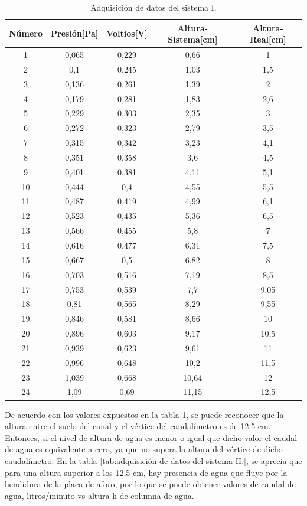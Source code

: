 \begin{table}[htpb]
	\centering
	\caption[Adquisición de datos del sistema I]{Adquisición de datos del sistema I.}
	\begin{tabular}{c c c c c}    
		\toprule
		\textbf{Número}   & \textbf{Presión[Pa]}  & \textbf{Voltios[V]} & \textbf{Altura-Sistema[cm]} & \textbf{Altura-Real[cm]} \\
		\midrule
		1  & 0,065 & 0,229  & 0,66  & 1 \\
		2  & 0,1   & 0,245  & 1,03  & 1,5 \\
		3  & 0,136 & 0,261  & 1,39  & 2 \\
		4  & 0,179 & 0,281  & 1,83  & 2,6 \\
		5  & 0,229 & 0,303	& 2,35  & 3  \\
		6  & 0,272 & 0,323  & 2,79  & 3,5 \\
		7  & 0,315 & 0,342	& 3,23  & 4,1 \\
		8  & 0,351 & 0,358	& 3,6   & 4,5   \\
		9  & 0,401 & 0,381	& 4,11	& 5,1 \\
		10 & 0,444 & 0,4	& 4,55	& 5,5 \\
		11 & 0,487 & 0,419	& 4,99	& 6,1 \\
		12 & 0,523 & 0,435	& 5,36	& 6,5 \\
		13 & 0,566 & 0,455	& 5,8	& 7 \\
		14 & 0,616 & 0,477	& 6,31	& 7,5 \\
		15 & 0,667 & 0,5	& 6,82	& 8 \\
		16 & 0,703 & 0,516	& 7,19	& 8,5 \\
		17 & 0,753 & 0,539	& 7,7	& 9,05 \\
		18 & 0,81  & 0,565	& 8,29	& 9,55 \\
		19 & 0,846 & 0,581	& 8,66	& 10 \\
		20 & 0,896 & 0,603	& 9,17	& 10,5 \\
		21 & 0,939 & 0,623	& 9,61	& 11 \\
		22 & 0,996 & 0,648	& 10,2	& 11,5 \\
		23 & 1,039 & 0,668	& 10,64	& 12\\
		24 & 1,09  & 0,69	& 11,15	& 12,5 \\

	
		\bottomrule
		\hline
	\end{tabular}
	\label{tab:adquisición de datos del sistema I.}
\end{table}

De acuerdo con los valores expuestos en la tabla \ref{tab:adquisición de datos del sistema I.}, se puede reconocer que la altura entre el suelo del canal y el vértice del caudalímetro es de 12,5 cm. Entonces, si el nivel de altura de agua es menor o igual que dicho valor el caudal de agua es equivalente a cero, ya que no supera la altura del vértice de dicho caudalímetro.
En la tabla \ref{tab:adquisición de datos del sistema II.}, se aprecia que para una altura superior a los 12,5 cm, hay presencia de agua que fluye por la hendidura de la placa de aforo, por lo que se puede obtener valores de caudal de agua, litros/minuto vs altura h de columna de agua.
 
